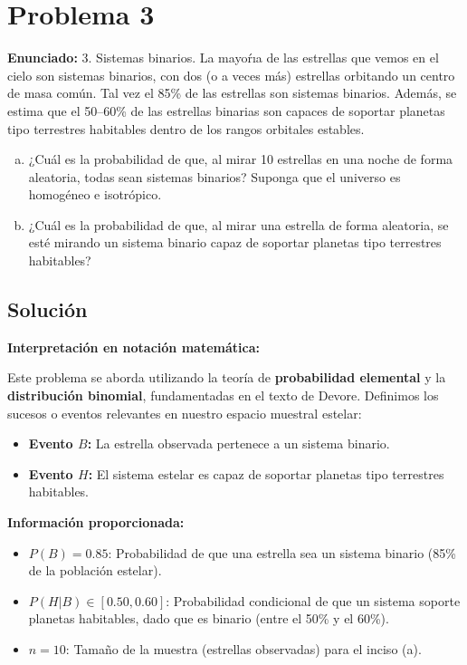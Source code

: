 \documentclass[a4paper]{article}
\begin{document}
\section{Problema 3}
\textbf{Enunciado:}
3. Sistemas binarios. La mayoŕıa de las estrellas que vemos en el cielo son sistemas binarios, con dos (o a veces más) estrellas orbitando un centro de masa común. Tal vez el 85\% de las estrellas son sistemas binarios. Además, se estima que el 50–60\% de las estrellas binarias son capaces de soportar planetas tipo terrestres habitables dentro de los rangos orbitales estables.
\begin{enumerate}[a.]
    \item ¿Cuál es la probabilidad de que, al mirar 10 estrellas en una noche de forma aleatoria, todas sean sistemas binarios? Suponga que el universo es homogéneo e isotrópico.
    \item ¿Cuál es la probabilidad de que, al mirar una estrella de forma aleatoria, se esté mirando un sistema binario capaz de soportar planetas tipo terrestres habitables?
\end{enumerate}

\subsection*{Solución}

\textbf{Interpretación en notación matemática:}

Este problema se aborda utilizando la teoría de \textbf{probabilidad elemental} y la \textbf{distribución binomial}, fundamentadas en el texto de Devore. Definimos los sucesos o eventos relevantes en nuestro espacio muestral estelar:

\begin{itemize}
    \item \textbf{Evento $B$:} La estrella observada pertenece a un sistema binario.
    \item \textbf{Evento $H$:} El sistema estelar es capaz de soportar planetas tipo terrestres habitables.
\end{itemize}

\textbf{Información proporcionada:}
\begin{itemize}
    \item $P(B) = 0.85$: Probabilidad de que una estrella sea un sistema binario (85\% de la población estelar).
    \item $P(H|B) \in [0.50, 0.60]$: Probabilidad condicional de que un sistema soporte planetas habitables, dado que es binario (entre el 50\% y el 60\%).
    \item $n = 10$: Tamaño de la muestra (estrellas observadas) para el inciso (a).
\end{itemize}
\end{document}
